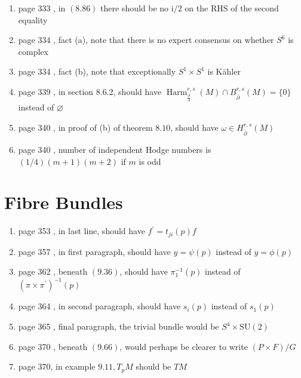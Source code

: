 \documentclass{article}
\begin{document}
\begin{enumerate}
\item page 333 , in $(8.86)$ there should be no $\mathrm{i} / 2$ on the $\mathrm{RHS}$ of the second equality

\item page 334 , fact (a), note that there is no expert consensus on whether $S^{6}$ is complex

\item page 334 , fact (b), note that exceptionally $S^{1} \times S^{1}$ is Kähler

\item page 339 , in section 8.6.2, should have $\operatorname{Harm}_{\frac{\partial}{\partial}}^{r, s}(M) \cap B_{\bar{\partial}}^{r, s}(M)=\{0\}$ instead of $\varnothing$

\item page 340 , in proof of (b) of theorem $8.10$, should have $\omega \in H_{\bar{\partial}}^{r, s}(M)$

\item page 340 , number of independent Hodge numbers is $(1 / 4)(m+1)(m+2)$ if $m$ is odd

\end{enumerate}
\section*{Fibre Bundles}

\begin{enumerate}
\item page 353 , in last line, should have $f^{\prime}=t_{j i}(p) f$

\item page 357 , in first paragraph, should have $y=\psi(p)$ instead of $y=\phi(p)$

\item page 362 , beneath $(9.36)$, should have $\pi_{1}^{-1}(p)$ instead of $\left(\pi \times \pi^{\prime}\right)^{-1}(p)$

\item page 364 , in second paragraph, should have $s_{i}(p)$ instead of $s_{1}(p)$

\item page 365 , final paragraph, the trivial bundle would be $S^{4} \times \mathrm{SU}(2)$

\item page 370 , beneath $(9.66)$, would perhaps be clearer to write $(P \times F) / G$

\item page 370, in example $9.11, T_{p} M$ should be $T M$
\end{enumerate}
\end{document}
